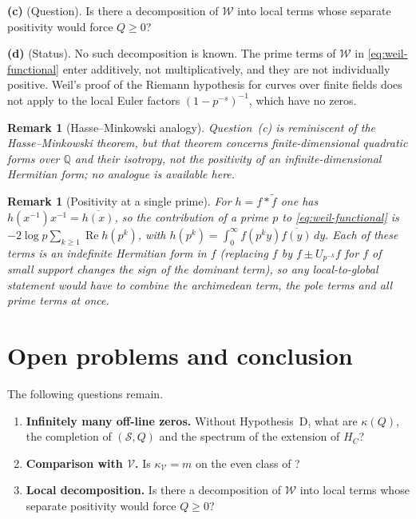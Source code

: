 \documentclass[11pt]{amsart}
\newtheorem{remark}[theorem]{Remark}
\renewcommand{\Re}{\operatorname{Re}}
\newcommand{\kap}{\kappa}
\newcommand{\Scal}{\mathcal{S}}
\newcommand{\Wcal}{\mathcal{W}}
\begin{document}
\medskip
\textbf{(c)} (Question).  Is there a decomposition of $\Wcal$ into local terms whose separate
positivity would force $Q \ge 0$?

\medskip
\textbf{(d)} (Status).  No such decomposition is known.  The prime terms of $\Wcal$ in
\eqref{eq:weil-functional} enter additively, not multiplicatively, and they are not
individually positive.  Weil's proof of the Riemann hypothesis for curves over finite fields
does not apply to the local Euler factors $(1-p^{-s})^{-1}$, which have no zeros.

\begin{remark}[Hasse--Minkowski analogy]
Question~(c) is reminiscent of the Hasse--Minkowski theorem, but that theorem concerns
finite-dimensional quadratic forms over $\mathbb Q$ and their isotropy, not the positivity of
an infinite-dimensional Hermitian form; no analogue is available here.
\end{remark}

\begin{remark}[Positivity at a single prime]
For $h=f*\tilde f$ one has $h(x^{-1})x^{-1}=\overline{h(x)}$, so the contribution of a prime
$p$ to \eqref{eq:weil-functional} is $-2\log p\sum_{k\ge1}\Re h(p^k)$, with
$h(p^k)=\int_0^\infty f(p^ky)\overline{f(y)}\,dy$.  Each of these terms is an indefinite
Hermitian form in $f$ (replacing $f$ by $f\pm U_{p^{-k}}f$ for $f$ of small support changes the
sign of the dominant term), so any local-to-global statement would have to combine the
archimedean term, the pole terms and all prime terms at once.
\end{remark}

\section{Open problems and conclusion}
\label{sec:conclusion}

The following questions remain.

\medskip
\begin{enumerate}
\setlength\itemsep{4pt}

\item \textbf{Infinitely many off-line zeros.}  Without Hypothesis~D, what are $\kap(Q)$, the
  completion of $(\Scal,Q)$ and the spectrum of the extension of $H_C$?

\item \textbf{Comparison with $\mathcal V$.}  Is $\kap_{\mathcal V}=m$ on the even class of
  \cite{Index}?

\item \textbf{Local decomposition.}  Is there a decomposition of $\Wcal$ into local terms whose
  separate positivity would force $Q\ge0$?

\end{enumerate}
\end{document}
